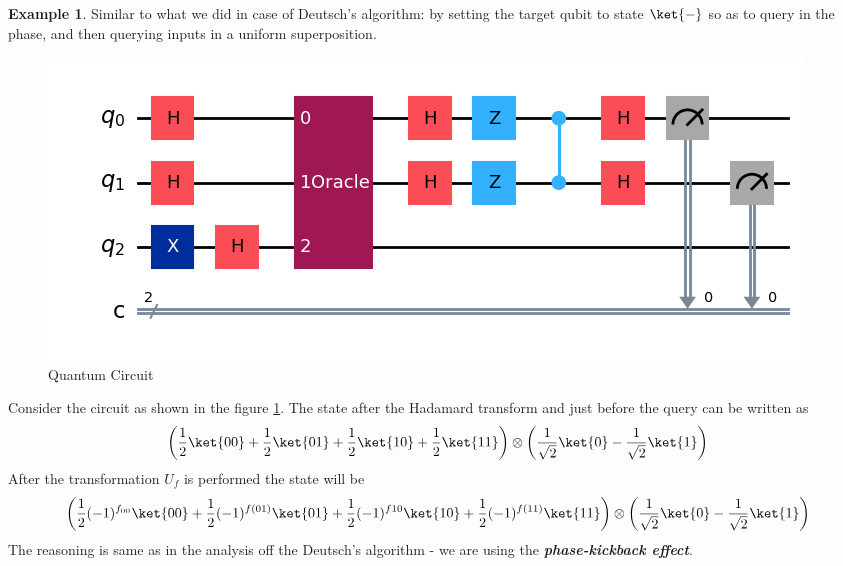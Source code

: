 \documentclass[12pt, oneside]{book}
\theoremstyle{definition}
\theoremstyle{definition}
\newtheorem{example}{Example}[section]
\theoremstyle{remark}
\begin{document}
\begin{example}
Similar to what we did in case of Deutsch's algorithm: by setting the target qubit to state $\ket{-}$ so as to query in the phase, and then querying inputs in a uniform superposition.
\begin{figure}
    \centering
    \includegraphics[width=1\linewidth]{../images/deutsch_example.png}
    \caption{Quantum Circuit}
    \label{fig:deutsch_example}
\end{figure}
Consider the circuit as shown in the figure \ref{fig:deutsch_example}. The state after the Hadamard transform and just before the query can be written as
\[
\left(\frac{1}{2}\ket{00}+\frac{1}{2}\ket{01}+\frac{1}{2}\ket{10}+\frac{1}{2}\ket{11}\right)\otimes \left(\frac{1}{\sqrt{2}}\ket{0}-\frac{1}{\sqrt{2}}\ket{1}\right)
\]
After the transformation $U_f$ is performed the state will be
\[
\left(\frac{1}{2}(-1)^{f_{00}}\ket{00}+\frac{1}{2}(-1)^{f(01)}\ket{01}+\frac{1}{2}(-1)^{f10}\ket{10}+\frac{1}{2}(-1)^{f(11)}\ket{11}\right)\otimes\left(\frac{1}{\sqrt{2}}\ket{0}-\frac{1}{\sqrt{2}}\ket{1}\right)
\]
The reasoning is same as in the analysis off the Deutsch's algorithm - we are using the \textbf{\textit{phase-kickback effect}}. 


\end{example}
\end{document}

